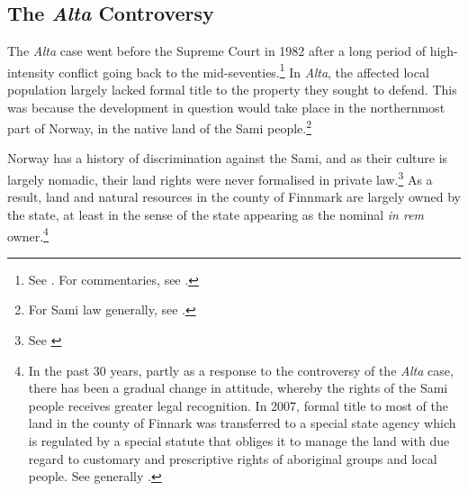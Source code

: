 


\subsection{The {\it Alta} Controversy}\label{sec:5:4:3}

The {\it Alta} case went before the Supreme Court in 1982 after a long period of high-intensity conflict going back to the mid-seventies.\footnote{See \cite{alta82}. For commentaries, see \cite{eckhoff82,boe83,hagvar88}.} In {\it Alta}, the affected local population largely lacked formal title to the property they sought to defend. This was because the development in question would take place in the northernmost part of Norway, in the native land of the Sami people.\footnote{For Sami law generally, see \cite{skogvang02}.}

Norway has a history of discrimination against the Sami, and as their culture is largely nomadic, their land rights were never formalised in private law.\footnote{See \cite[149-156]{ravna12s}} As a result, land and natural resources in the county of Finnmark are largely owned by the state, at least in the sense of the state appearing as the nominal {\it in rem} owner.\footnote{In the past 30 years, partly as a response to the controversy of the {\it Alta} case, there has been a gradual change in attitude, whereby the rights of the Sami people receives greater legal recognition. In 2007, formal title to most of the land in the county of Finnark was transferred to a special state agency which is regulated by a special statute that obliges it to manage the land with due regard to customary and prescriptive rights of aboriginal groups and local people. See generally \cite{bull07}.}

